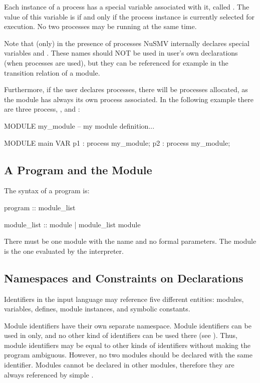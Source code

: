 Each instance of a process has a special \Boolean variable associated
with it, called .
%
The value of this variable is  if and only if the process
instance is currently selected for execution.
%
No two processes may be running at the same time.

Note that (only) in the presence of processes NuSMV internally
declares special variables 
and . These names should NOT be used in
user's own declarations (when processes are used), but they can be
referenced for example in the transition relation of a module.

Furthermore, if the user declares  processes, there will be
 processes allocated, as the module  has always its
own process associated. In the following example there are three
process, ,  and :
%
\begin{nusmvCode}
MODULE my_module
  -- my module definition...

MODULE main
  VAR
    p1 : process my_module;
    p2 : process my_module;

\end{nusmvCode}
%

\subsection{A Program and the  Module}
\label{Main Module}
%
The syntax of a \nusmv program is:
%
\begin{Grammar}
program :: module_list

module_list ::
          module
        | module_list module
\end{Grammar}
%
There must be one module with the name  and no formal
parameters.
%
The module  is the one evaluated by the interpreter.

\subsection{Namespaces and Constraints on Declarations}
\label{Namespaces}
%
Identifiers in the \nusmv input language may reference five different
entities: modules, variables, defines, module instances, and symbolic
constants.

Module identifiers have their own separate namespace.
%
Module identifiers can be used in 
only, and no other kind of identifiers can be used there (see
).
%
Thus, module identifiers may be equal to other kinds of identifiers
without making the program ambiguous.
%
However, no two modules should be declared with the same
identifier.
%
Modules cannot be declared in other modules, therefore they are always
referenced by simple .

